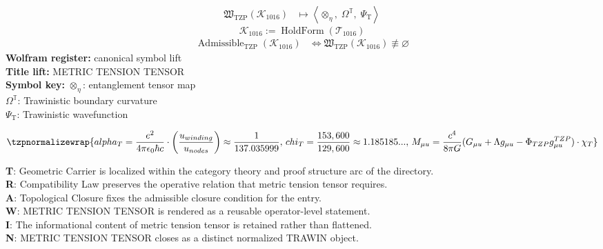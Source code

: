 \noindent
\begin{minipage}[t]{0.48\linewidth}
\begingroup
\small
\[
\begin{aligned}
\mathfrak{W}_{\mathrm{TZP}}\!\left(\mathcal{K}_{1016}\right)
&\longmapsto
\left\langle \otimes_{\eta},\; \Omega^{\mathbb{T}},\; \Psi_{\mathrm{T}} \right\rangle
\end{aligned}
\]
\[
\mathcal{K}_{1016}
:=
\operatorname{HoldForm}\!\left(\mathcal{T}_{1016}\right)
\]
\[
\begin{aligned}
\operatorname{Admissible}_{\mathrm{TZP}}\!\left(\mathcal{K}_{1016}\right)
&\Longleftrightarrow
\mathfrak{W}_{\mathrm{TZP}}\!\left(\mathcal{K}_{1016}\right)\not\equiv\varnothing
\end{aligned}
\]
\textbf{Wolfram register:} canonical symbol lift\\
\textbf{Title lift:} METRIC TENSION TENSOR\\
\textbf{Symbol key:} \(\otimes_{\eta}\): entanglement tensor map\\ \(\Omega^{\mathbb{T}}\): Trawinistic boundary curvature\\ \(\Psi_{\mathrm{T}}\): Trawinistic wavefunction
\par
\endgroup
\end{minipage}\hfill
\begin{minipage}[t]{0.48\linewidth}
\[
\tzpnormalizewrap{alpha_T = \frac{e^2}{4\pi\epsilon_0 \hbar c} \cdot \left( \frac{ u_{winding}}{ u_{nodes}} \right) \approx \frac{1}{137.035999},\,chi_T = \frac{153,600}{129,600} \approx 1.185185...,\,M_{\mu u} = \frac{c^4}{8\pi G} (G_{\mu u} + \Lambda g_{\mu u} - \Phi_{TZP} g^{TZP}_{\mu u}) \cdot \chi_T}
\]

\small
\textbf{T}: Geometric Carrier is localized within the category theory and proof structure arc of the directory.\\
\textbf{R}: Compatibility Law preserves the operative relation that metric tension tensor requires.\\
\textbf{A}: Topological Closure fixes the admissible closure condition for the entry.\\
\textbf{W}: METRIC TENSION TENSOR is rendered as a reusable operator-level statement.\\
\textbf{I}: The informational content of metric tension tensor is retained rather than flattened.\\
\textbf{N}: METRIC TENSION TENSOR closes as a distinct normalized TRAWIN object.
\normalsize
\end{minipage}

